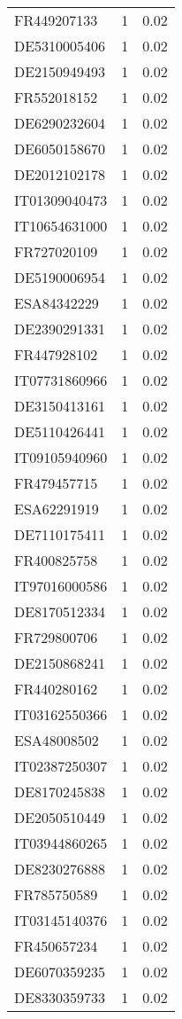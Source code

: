 \begin{table*}[htbp]
\begin{tabular}{lrr}
FR449207133 & 1 & 0.02 \\
DE5310005406 & 1 & 0.02 \\
DE2150949493 & 1 & 0.02 \\
FR552018152 & 1 & 0.02 \\
DE6290232604 & 1 & 0.02 \\
DE6050158670 & 1 & 0.02 \\
DE2012102178 & 1 & 0.02 \\
IT01309040473 & 1 & 0.02 \\
IT10654631000 & 1 & 0.02 \\
FR727020109 & 1 & 0.02 \\
DE5190006954 & 1 & 0.02 \\
ESA84342229 & 1 & 0.02 \\
DE2390291331 & 1 & 0.02 \\
FR447928102 & 1 & 0.02 \\
IT07731860966 & 1 & 0.02 \\
DE3150413161 & 1 & 0.02 \\
DE5110426441 & 1 & 0.02 \\
IT09105940960 & 1 & 0.02 \\
FR479457715 & 1 & 0.02 \\
ESA62291919 & 1 & 0.02 \\
DE7110175411 & 1 & 0.02 \\
FR400825758 & 1 & 0.02 \\
IT97016000586 & 1 & 0.02 \\
DE8170512334 & 1 & 0.02 \\
FR729800706 & 1 & 0.02 \\
DE2150868241 & 1 & 0.02 \\
FR440280162 & 1 & 0.02 \\
IT03162550366 & 1 & 0.02 \\
ESA48008502 & 1 & 0.02 \\
IT02387250307 & 1 & 0.02 \\
DE8170245838 & 1 & 0.02 \\
DE2050510449 & 1 & 0.02 \\
IT03944860265 & 1 & 0.02 \\
DE8230276888 & 1 & 0.02 \\
FR785750589 & 1 & 0.02 \\
IT03145140376 & 1 & 0.02 \\
FR450657234 & 1 & 0.02 \\
DE6070359235 & 1 & 0.02 \\
DE8330359733 & 1 & 0.02 \\

\end{tabular}
\end{table*}
